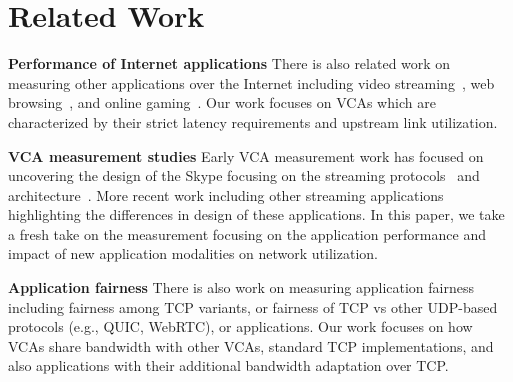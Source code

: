 \section{Related Work}\label{sec:related}
\textbf{Performance of Internet applications}
There is also related work on measuring other applications over the Internet including video streaming~\cite{}, web browsing~\cite{}, and online gaming~\cite{}. Our work focuses on VCAs which are characterized by their strict latency requirements and upstream link utilization.  

\textbf{VCA measurement studies}
Early VCA measurement work has focused on uncovering the design of the Skype focusing on the streaming protocols~\cite{guha2005experimental} and architecture~\cite{baset2004analysis, bonfiglio2008detailed, bonfiglio2008tracking}. More recent work including other streaming applications~\cite{xu2012video, nistico2020comparative} highlighting the differences in design of these applications. In this paper, we take a fresh take on the measurement focusing on the application performance and impact of new application modalities on network utilization. 



\textbf{Application fairness}
There is also work on measuring application fairness including fairness among TCP variants, or fairness of TCP vs other UDP-based protocols (e.g., QUIC, WebRTC), or applications. Our work focuses on how VCAs share bandwidth with other VCAs, standard TCP implementations, and also applications with their additional bandwidth adaptation over TCP. 

